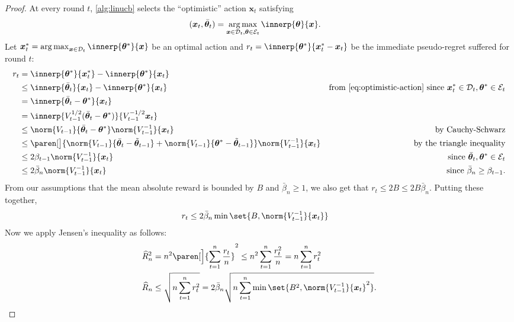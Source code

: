 \documentclass{article}
\renewcommand{\vec}[1]{\bm{#1}}
\newcommand{\inv}[1]{#1^{-1}}
\DeclareMathOperator*{\argmax}{arg\,max}
\DeclarePairedDelimiter{\paren}()
\newcommand{\Dset}[1]{\mathcal{D}_{#1}}
\newcommand{\Eset}[1]{\mathcal{E}_{#1}}
\begin{document}
\begin{proof}
  At every round $t$, \cref{alg:linucb} selects the ``optimistic''
  action $\vec x_t$ satisfying
  \begin{align}\label{eq:optimistic-action}
    (\vec x_t,\bar{\vec\theta}_t)
    &= \argmax_{\vec x\in\Dset{t},\vec\theta\in\Eset{t}} \innerp{\vec\theta}{\vec x}.
  \end{align}
  Let $\vec x_t^* = \argmax_{\vec x\in\Dset{t}}\innerp{\vec\theta^*}{\vec x}$ be an optimal
  action and $r_t = \innerp{\vec\theta^*}{\vec x_t^* - \vec x_t}$ be the immediate
  pseudo-regret suffered for round $t$:
  \begin{align*}
    r_t &= \innerp{\vec\theta^*}{\vec x_t^*} - \innerp{\vec\theta^*}{\vec x_t} \\
        &\le \innerp{\bar{\vec\theta}_t}{\vec x_t} - \innerp{\vec\theta^*}{\vec x_t}
        &\text{from \eqref{eq:optimistic-action} since }
          \vec x_t^*\in\Dset{t}, \vec\theta^*\in\Eset{t} \\
        &= \innerp{\bar{\vec\theta}_t - \vec\theta^*}{\vec x_t} \\
        &= \innerp{V_{t-1}^{1/2}(\bar{\vec\theta}_t - \vec\theta^*)}{V_{t-1}^{-1/2} \vec x_t} \\
        &\le \norm{V_{t-1}}{\bar{\vec\theta}_t - \vec\theta^*}\norm{\inv{V_{t-1}}}{\vec x_t}
        &\text{by Cauchy-Schwarz}\\
        &\le \paren[\big]{\norm{V_{t-1}}{\bar{\vec\theta}_t - \tilde{\vec\theta}_{t-1}}
          + \norm{V_{t-1}}{\vec\theta^* - \tilde{\vec\theta}_{t-1}}}
          \norm{\inv{V_{t-1}}}{\vec x_t}
        &\text{by the triangle inequality}\\
        &\le 2\beta_{t-1}\norm{\inv{V_{t-1}}}{\vec x_t}
        &\text{since } \bar{\vec\theta}_t, \vec\theta^* \in \Eset{t} \\
        &\le 2\bar\beta_n\norm{\inv{V_{t-1}}}{\vec x_t}
        &\text{since } \bar\beta_n \ge \beta_{t-1}.
  \end{align*}
  From our assumptions that the mean absolute reward is bounded by $B$
  and $\bar\beta_n \ge 1$, we also get that
  $r_t \le 2B \le 2B\bar\beta_n$.  Putting these together,
  \begin{align}\label{eq:regret-bound-oneround}
    r_t &\le 2\bar\beta_n \min\set{B, \norm{\inv{V_{t-1}}}{\vec x_t}}
  \end{align}
  Now we apply Jensen's inequality as follows:
  \begin{align*}
    \widehat R_n^2 &= n^2 \paren[\Big]{\sum_{t=1}^n \frac{r_t}{n}}^2
                   \le n^2 \sum_{t=1}^n \frac{r_t^2}{n} = n\sum_{t=1}^nr_t^2 \\
    \widehat R_n &\le \sqrt{n\sum_{t=1}^n r_t^2}
                  =  2\bar\beta_n\sqrt{n\sum_{t=1}^n\min\set{B^2,
                  \norm{\inv{V_{t-1}}}{\vec x_t}^2}}.
                  \qedhere
  \end{align*}
\end{proof}
\end{document}

